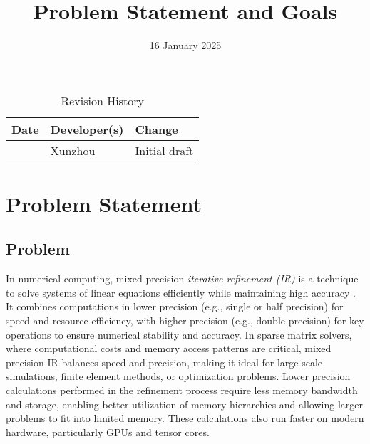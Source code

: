 \documentclass{article}
\title{Problem Statement and Goals\\\progname}
\author{\authname}
\date{}
\begin{document}
\maketitle

\begin{table}[hp]
  \caption{Revision History} \label{TblRevisionHistory}
  \begin{tabularx}{\textwidth}{llX}
    \toprule
    \textbf{Date} & \textbf{Developer(s)} & \textbf{Change}\\
    \midrule
    \date{16 January 2025} & Xunzhou & Initial draft \\
    \bottomrule
  \end{tabularx}
\end{table}

\section{Problem Statement}



\subsection{Problem}

In numerical computing, mixed precision \emph{iterative refinement (IR)} is a
technique to solve systems of linear equations efficiently while maintaining
high accuracy \cite{lindquist_improving_2020}. It combines computations in lower
precision (e.g., single or half precision) for speed and resource efficiency,
with higher precision (e.g., double precision) for key operations to ensure
numerical stability and accuracy. In sparse matrix solvers, where computational
costs and memory access patterns are critical, mixed precision IR balances speed
and precision, making it ideal for large-scale simulations, finite element
methods, or optimization problems. Lower precision calculations performed in the
refinement process require less memory bandwidth and storage, enabling better
utilization of memory hierarchies and allowing larger problems to fit into
limited memory. These calculations also run faster on modern hardware,
particularly GPUs and tensor cores.
\end{document}

